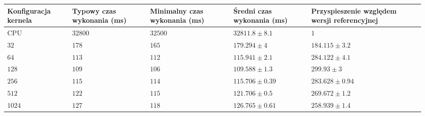 \documentclass[12pt, a4paper]{article}
\begin{document}
\begin{center}
\begin{tabular}{|p{2.21cm}|p{2.7cm}|p{2.5cm}|p{2.5cm}|p{2.9cm}|}
    \hline
    \rowcolor{gray}
    \textbf{Konfiguracja \newline kernela} & \textbf{Typowy \newline czas wykonania (ms)} & \textbf{Minimalny czas wykonania (ms)} & \textbf{Średni \newline czas wykonania \newline (ms)} & \textbf{Przyspieszenie względem \newline wersji \newline referencyjnej}\\
    \hline
    CPU & $32800$ & $32500$ & $32811.8\pm8.1$ & $1$\\
    \hline
    $32$ & $178$ & $165$ & $179.294\pm4$ & $184.115\pm3.2$\\
    \hline
    $64$ & $113$ & $112$ & $115.941\pm2.1$ & $284.122\pm4.1$\\
    \hline
    $128$ & $109$ & $106$ & $109.588\pm1.3$ & $299.93\pm3$\\
    \hline
    $256$ & $115$ & $114$ & $115.706\pm0.39$ & $283.628\pm0.94$\\
    \hline
    $512$ & $122$ & $115$ & $121.706\pm0.5$ & $269.672\pm1.2$\\
    \hline
    $1024$ & $127$ & $118$ & $126.765\pm0.61$ & $258.939\pm1.4$\\
    \hline
\end{tabular}


\end{center}
\end{document}
